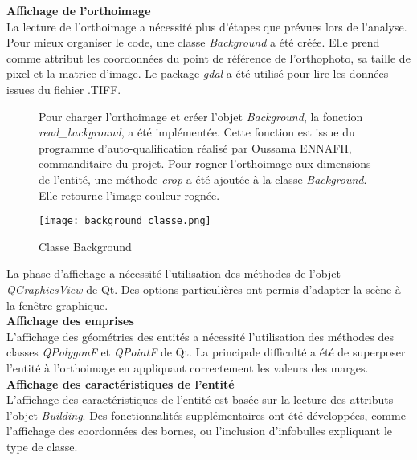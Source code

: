 \noindent\textbf{Affichage de l'orthoimage}\\

La lecture de l'orthoimage a nécessité plus d'étapes que prévues lors de l'analyse. Pour mieux organiser le code, une classe \textit{Background} a été créée. Elle prend comme attribut les coordonnées du point de référence de l'orthophoto, sa taille de pixel et la matrice d'image. Le package \textit{gdal} a été utilisé pour lire les données issues du fichier .TIFF.\\

\begin{figure}[!h]
	\begin{minipage}{0.50\linewidth}\parindent12pt
		\indent  Pour charger l'orthoimage et créer l'objet \textit{Background}, la fonction \textit{read\_background},  a été implémentée. Cette fonction est issue du programme  d'auto-qualification réalisé par Oussama ENNAFII, commanditaire du projet. Pour rogner l'orthoimage aux dimensions de l'entité, une méthode \textit{crop} a été ajoutée à la classe \textit{Background}. Elle retourne l'image couleur rognée.\\
	\end{minipage}
	\hfill
	\begin{minipage}{0.45\linewidth}
		\centering
		\texttt{[image: background\_classe.png]}  \\
		\caption[Classe Background]{Classe Background}
		\label{fig:backclasse}
	\end{minipage}
\end{figure}

La phase d'affichage a nécessité l'utilisation des méthodes de l'objet \textit{QGraphicsView} de Qt. Des options particulières ont permis d'adapter la scène à la fenêtre graphique.\\

\noindent\textbf{Affichage des emprises}\\

L'affichage des géométries des entités a nécessité l'utilisation des méthodes des classes \textit{QPolygonF} et \textit{QPointF} de Qt. La principale difficulté a été de superposer l'entité à l'orthoimage en appliquant correctement les valeurs des marges.\\

\noindent\textbf{Affichage des caractéristiques de l'entité}\\

L'affichage des caractéristiques de l'entité est basée sur la lecture des attributs l'objet \textit{Building}. Des fonctionnalités supplémentaires ont été développées, comme l'affichage des coordonnées des bornes, ou l'inclusion d'infobulles expliquant le type de classe.


